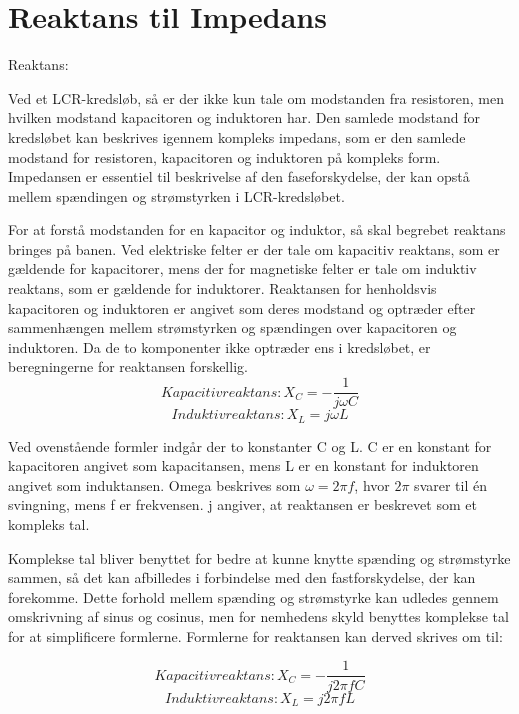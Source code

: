 \section{Reaktans til Impedans}
Reaktans:

Ved et LCR-kredsløb, så er der ikke kun tale om modstanden fra resistoren, men hvilken modstand kapacitoren og induktoren har. Den samlede modstand for kredsløbet kan beskrives igennem kompleks impedans, som er den samlede modstand for resistoren, kapacitoren og induktoren på kompleks form. Impedansen er essentiel til beskrivelse af den faseforskydelse, der kan opstå mellem spændingen og strømstyrken i LCR-kredsløbet.

For at forstå modstanden for en kapacitor og induktor, så skal begrebet reaktans bringes på banen. Ved elektriske felter er der tale om kapacitiv reaktans, som er gældende for kapacitorer, mens der for magnetiske felter er tale om induktiv reaktans, som er gældende for induktorer. Reaktansen for henholdsvis kapacitoren og induktoren er angivet som deres modstand og optræder efter sammenhængen mellem strømstyrken og spændingen over kapacitoren og induktoren. Da de to komponenter ikke optræder ens i kredsløbet, er beregningerne for reaktansen forskellig.
\begin{equation}
Kapacitiv reaktans: X_C = - \frac{1}{j \omega C}
\end{equation}
\begin{equation}
Induktiv reaktans: X_L = j \omega L
\end{equation}

Ved ovenstående formler indgår der to konstanter C og L. C er en konstant for kapacitoren angivet som kapacitansen, mens L er en konstant for induktoren angivet som induktansen. Omega beskrives som $\omega = 2 \pi f$, hvor $2 \pi$ svarer til én svingning, mens f er frekvensen. j angiver, at reaktansen er beskrevet som et kompleks tal.

Komplekse tal bliver benyttet for bedre at kunne knytte spænding og strømstyrke sammen, så det kan afbilledes i forbindelse med den fastforskydelse, der kan forekomme. Dette forhold mellem spænding og strømstyrke kan udledes gennem omskrivning af sinus og cosinus, men for nemhedens skyld benyttes komplekse tal for at simplificere formlerne. Formlerne for reaktansen kan derved skrives om til:

\begin{equation}
Kapacitiv reaktans: X_C = - \frac{1}{j 2 \pi f C}
\end{equation}
\begin{equation}
Induktiv reaktans: X_L = j 2 \pi f L
\end{equation}

